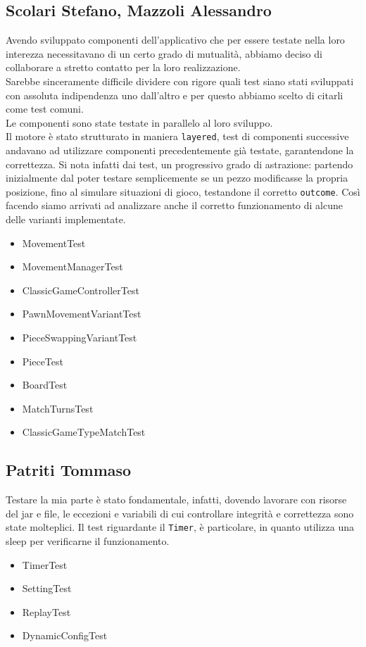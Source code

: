 \documentclass[a4paper,12pt]{report}
\begin{document}
\subsection{Scolari Stefano, Mazzoli Alessandro}
Avendo sviluppato componenti dell'applicativo che per essere testate nella loro interezza necessitavano di un certo grado di mutualità, abbiamo deciso di collaborare a stretto contatto per la loro realizzazione.\\
Sarebbe sinceramente difficile dividere con rigore quali test siano stati sviluppati con assoluta indipendenza uno dall'altro e per questo abbiamo scelto di citarli come test comuni.\\
Le componenti sono state testate in parallelo al loro sviluppo.
\\
Il motore è stato strutturato in maniera \texttt{layered}, test di componenti successive andavano ad utilizzare componenti precedentemente già testate, garantendone la correttezza.
Si nota infatti dai test, un progressivo grado di astrazione: partendo inizialmente dal poter testare semplicemente se un pezzo modificasse la propria posizione, fino al simulare situazioni di gioco, testandone il corretto \texttt{outcome}.
Così facendo siamo arrivati ad analizzare anche il corretto funzionamento di alcune delle varianti implementate.
\begin{itemize}
    \item MovementTest
    \item MovementManagerTest
    \item ClassicGameControllerTest
    \item PawnMovementVariantTest
    \item PieceSwappingVariantTest
    \item PieceTest
    \item BoardTest
    \item MatchTurnsTest
    \item ClassicGameTypeMatchTest
\end{itemize}

\subsection{Patriti Tommaso}
Testare la mia parte è stato fondamentale, infatti, dovendo lavorare con risorse del jar e file, le eccezioni e variabili di cui controllare integrità e correttezza sono state molteplici.
Il test riguardante il \texttt{Timer}, è particolare, in quanto utilizza una sleep per verificarne il funzionamento.
\begin{itemize}
    \item TimerTest
    \item SettingTest
    \item ReplayTest
    \item DynamicConfigTest

\end{itemize}
\end{document}
